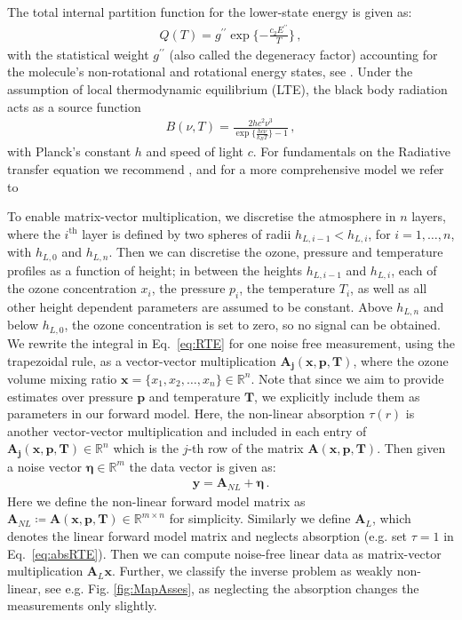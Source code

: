 The total internal partition function for the lower-state energy is given as:
\begin{align}
	Q(T )= g^{\prime \prime} \exp{\{ - \frac{ c_2 E^{\prime \prime} }{T}\}} \, ,
\end{align}
with the statistical weight $ g^{\prime \prime}$ (also called the degeneracy factor) accounting for the molecule's non-rotational and rotational energy states, see \cite{vsimevckova2006einstein}.
Under the assumption of local thermodynamic equilibrium (LTE), the black body radiation acts as a source function
\begin{align}
	B(\nu,T)   = \frac{2 h c^2 \nu^3}{\exp{\{\frac{hc\nu}{k_B T}\}}-1}\, ,
\end{align}
with Planck's constant $h$ and speed of light $c$.
For fundamentals on the Radiative transfer equation we recommend \cite[Chapter 1]{rybicki2000rte}, and for a more comprehensive model we refer to \cite{read2006forwardModel}

To enable matrix-vector multiplication, we discretise the atmosphere in $n$ layers, where the $i^\text{th}$ layer is defined by two spheres of radii $h_{L,i-1} < h_{L,i}$, for $i = 1, \dots, n$, with $h_{L,0}$ and $h_{L,n} $.
Then we can discretise the ozone, pressure and temperature profiles as a function of height; in between the heights $h_{L,i-1}$ and $h_{L,i}$, each of the ozone concentration $x_{i}$, the pressure $p_{i}$, the temperature $T_{i}$, as well as all other height dependent parameters are assumed to be constant.
Above $h_{L, n}$ and below $h_{L,0} $, the ozone concentration is set to zero, so no signal can be obtained.
We rewrite the integral in Eq.~\eqref{eq:RTE} for one noise free measurement, using the trapezoidal rule, as a vector-vector multiplication $\bm{A_{j}}(\bm{x},  \bm{p},\bm{T})$, where the ozone volume mixing ratio $\bm{x} =\{x_1,x_2,\ldots,x_n\} \in \mathbb{R}^{n}$.
Note that since we aim to provide estimates over pressure $\bm{p}$ and temperature $\bm{T}$, we explicitly include them as parameters in our forward model.
Here, the non-linear absorption $\tau(r)$ is another vector-vector multiplication and included in each entry of $\bm{A_{j}}(\bm{x},  \bm{p},\bm{T}) \in \mathbb{R}^{n}$ which is the $j$-th row of the matrix $\bm{A}(\bm{x},  \bm{p},\bm{T})$.
Then given a noise vector $\bm{\eta} \in \mathbb{R}^{m}$ the data vector is given as:
\begin{align}
	\bm{y} = \bm{A}_{NL} + \bm{\eta}\, .
\end{align}
Here we define the non-linear forward model matrix as $\bm{A}_{NL} \coloneqq \bm{A}(\bm{x},  \bm{p},\bm{T})   \in \mathbb{R}^{m \times n}$ for simplicity.
Similarly we define $\bm{A}_L$, which denotes the linear forward model matrix and neglects absorption (e.g. set $\tau = 1$ in Eq.~\eqref{eq:absRTE}).
Then we can compute noise-free linear data as matrix-vector multiplication $\bm{A}_L \bm{x}$.
Further, we classify the inverse problem as weakly non-linear, see e.g. Fig. \ref{fig:MapAsses}, as neglecting the absorption changes the measurements only slightly.



